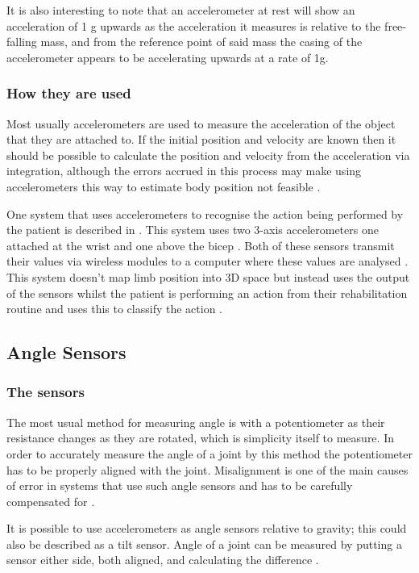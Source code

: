 \documentclass[journal]{IEEEtran}
\begin{document}
It is also interesting to note that an accelerometer at rest will show an acceleration of 1 g upwards as 
the acceleration it measures is relative to the free-falling mass, and from the reference point of said 
mass the casing of the accelerometer appears to be accelerating upwards at a rate of 1g.

\subsubsection{How they are used}
Most usually accelerometers are used to measure the acceleration of the object that they are attached to. 
If the initial position and velocity are known then it should be possible to calculate the position and velocity 
from the acceleration via integration, although the errors accrued in this process may make using accelerometers 
this way to estimate body position not feasible \cite{ACfeasable}.

One system that uses accelerometers to recognise the action being performed by the patient 
is described in \cite{ACSVM}. This system uses two 3-axis accelerometers 
one attached at the wrist and one above the bicep \cite{ACSVM}. Both of these sensors transmit their 
values via wireless modules to a computer where these values are analysed \cite{ACSVM}. This system 
doesn't map limb position into 3D space but instead uses the output of the sensors whilst the 
patient is performing an action from their rehabilitation routine and uses this to classify the 
action \cite{ACSVM}.

\subsection{Angle Sensors} 
\subsubsection{The sensors}
The most usual method for measuring angle is with a potentiometer as their resistance changes as 
they are rotated, which is simplicity itself to measure. In order to accurately measure the angle of 
a joint by this method the potentiometer has to be properly aligned with the joint. Misalignment is 
one of the main causes of error in systems that use such angle sensors and has to be carefully 
compensated for \cite{AdvancesPush}.

It is possible to use accelerometers as angle sensors relative to gravity; this could also be described 
as a tilt sensor. Angle of a joint can be measured by putting a sensor either side, both aligned, and 
calculating the difference \cite{ACangle}.
\end{document}
